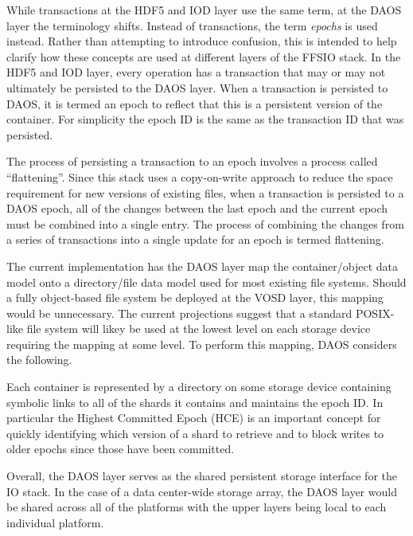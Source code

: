 \documentclass[conference]{IEEEtran}
\begin{document}
While transactions at the HDF5 and IOD layer use the same term, at the DAOS
layer the terminology shifts. Instead of transactions, the term {\em epochs}
is used instead. Rather than attempting to introduce confusion, this is intended
to help clarify how these concepts are used at different layers of the FFSIO
stack. In the HDF5 and IOD layer, every operation has a transaction that may
or may not ultimately be persisted to the DAOS layer. When a transaction is
persisted to DAOS, it is termed an epoch to reflect that this is a persistent
version of the container. For simplicity the epoch ID is the same as the
transaction ID that was persisted.

The process of persisting a transaction to an epoch involves a process called
``flattening''. Since this stack uses a copy-on-write approach to reduce the
space requirement for new versions of existing files, when a transaction is
persisted to a DAOS epoch, all of the changes between the last epoch and the
current epoch must be combined into a single entry. The process of combining
the changes from a series of transactions into a single update for an epoch
is termed flattening.


The current implementation has the DAOS layer map the container/object data
model onto a directory/file data model used for most existing file systems.
Should a fully object-based file system be deployed at the VOSD layer, this
mapping would be unnecessary. The current projections suggest that a standard
POSIX-like file system will likey be used at the lowest level on each storage
device requiring the mapping at some level. To perform this mapping, DAOS
considers the following.

Each container is represented by a directory on some storage device containing
symbolic links to all of the shards it contains and maintains the epoch ID.
In particular the Highest Committed Epoch (HCE) is an important concept for
quickly identifying which version of a shard to retrieve and to block writes to
older epochs since those have been committed.

Overall, the DAOS layer serves as the shared persistent storage interface for
the IO stack. In the case of a data center-wide storage array, the DAOS layer
would be shared across all of the platforms with the upper layers being local
to each individual platform.
\end{document}
